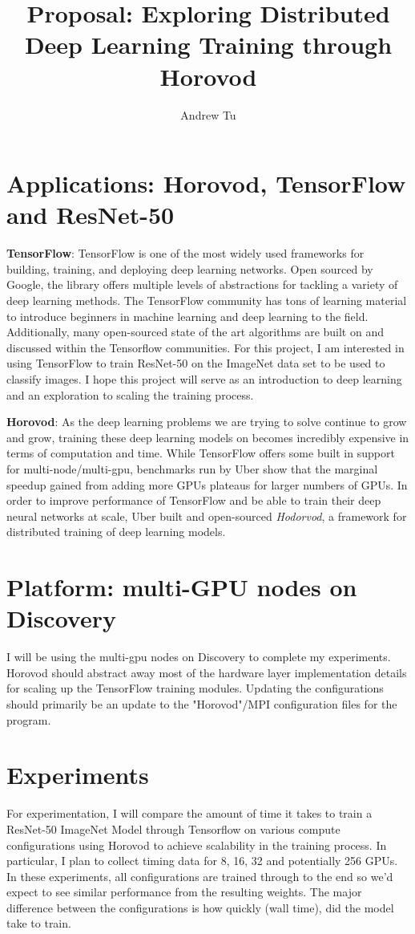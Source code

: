 \documentclass[11pt, oneside]{article}   	%
\title{Proposal: Exploring Distributed Deep Learning Training through Horovod}
\author{Andrew Tu}
\begin{document}
\maketitle

\section{Applications: Horovod, TensorFlow and ResNet-50}
\textbf{TensorFlow}: TensorFlow is one of the most widely used frameworks for building, training, and deploying deep learning networks. Open sourced by Google, 
the library offers multiple levels of abstractions for tackling a variety of deep learning methods. The TensorFlow community has tons of learning material to introduce
beginners in machine learning and deep learning to the field. Additionally, many open-sourced state of the art algorithms are built on and discussed within the Tensorflow 
communities. For this project, I am interested in using TensorFlow to train ResNet-50 on the ImageNet data set to be used to classify images. I hope this project will
serve as an introduction to deep learning and an exploration to scaling the training process. 

\textbf{Horovod}: As the deep learning problems we are trying to solve continue to grow and grow, training these deep learning models on becomes incredibly expensive in terms
of computation and time. While TensorFlow offers some built in support for multi-node/multi-gpu, benchmarks run by Uber show that the marginal speedup gained
from adding more GPUs plateaus for larger numbers of GPUs. In order to improve performance of TensorFlow and be able to train their deep neural networks 
at scale, Uber built and open-sourced \textit{Hodorvod}, a framework for distributed training of deep learning models. 


\section{Platform: multi-GPU nodes on Discovery}
I will be using the multi-gpu nodes on Discovery to complete my experiments. Horovod should abstract away most of the hardware layer implementation details for
scaling up the TensorFlow training modules. Updating the configurations should primarily be an update to the "Horovod"/MPI configuration files for the program. 

\section{Experiments}
For experimentation, I will compare the amount of time it takes to train a ResNet-50 ImageNet Model through Tensorflow on various compute configurations 
using Horovod to achieve scalability in the training process. In particular, I plan to collect timing data for 8, 16, 32 and potentially 256 GPUs. In these experiments,
all configurations are trained through to the end so we'd expect to see similar performance from the resulting weights. The major difference between the configurations
is how quickly (wall time), did the model take to train. 
\end{document}
